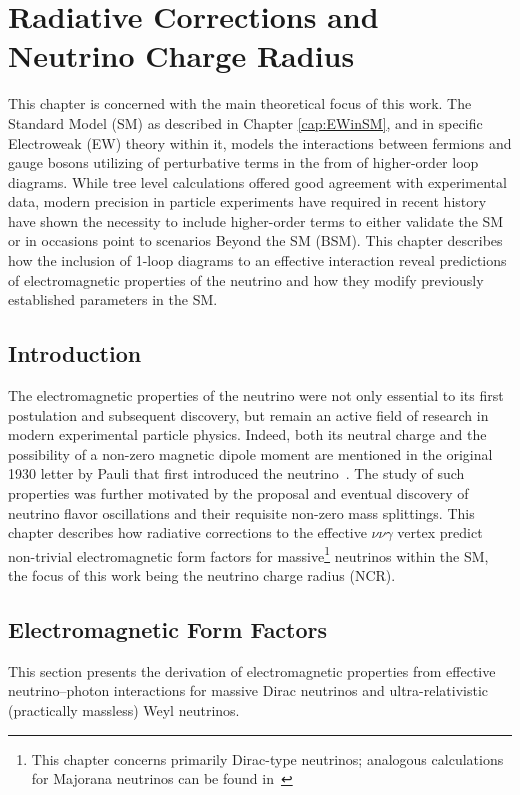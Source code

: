 \chapter{Radiative Corrections and Neutrino Charge Radius}\label{cap:NCR}
This chapter is concerned with the main theoretical focus of this work. The Standard Model (SM) as described in Chapter \ref{cap:EWinSM}, and in specific Electroweak (EW) theory within it, models the interactions between fermions and gauge bosons utilizing of perturbative terms in the from of higher-order loop diagrams. While tree level calculations offered good agreement with experimental data, modern precision in particle experiments have required in recent history have shown the necessity to include higher-order terms to either validate the SM or in occasions point to scenarios Beyond the SM (BSM). This chapter describes how the inclusion of 1-loop diagrams to an effective interaction reveal predictions of electromagnetic properties of the neutrino and how they modify previously established parameters in the SM.

\section{Introduction}
The electromagnetic properties of the neutrino were not only essential to its first postulation and subsequent discovery, but remain an active field of research in modern experimental particle physics. Indeed, both its neutral charge and the possibility of a non-zero magnetic dipole moment are mentioned in the original 1930 letter by Pauli that first introduced the neutrino~\cite{pauli1930neutrino}. The study of such properties was further motivated by the proposal and eventual discovery of neutrino flavor oscillations and their requisite non-zero mass splittings. This chapter describes how radiative corrections to the effective $\nu\nu\gamma$ vertex predict non-trivial electromagnetic form factors for massive\footnote{This chapter concerns primarily Dirac-type neutrinos; analogous calculations for Majorana neutrinos can be found in~\cite{PhysRevD.26.3152, PhysRevD.26.1662, RevModPhys.87.531}} neutrinos within the SM, the focus of this work being the neutrino charge radius (NCR).

\section{Electromagnetic Form Factors}\label{sec:EMFF}
This section presents the derivation of electromagnetic properties from effective neutrino--photon interactions for massive Dirac neutrinos and ultra-relativistic (practically massless) Weyl neutrinos.
